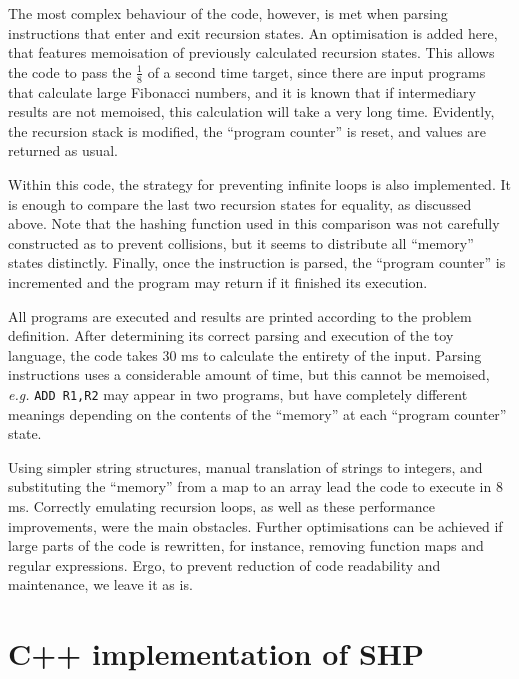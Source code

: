 \documentclass[12pt]{article}
\begin{document}
The most complex behaviour of the code, however, is met when parsing instructions that enter and exit recursion states. An optimisation is added here, that features memoisation of previously calculated recursion states. This allows the code to pass the $\frac{1}{8}$ of a second time target, since there are input programs that calculate large Fibonacci numbers, and it is known that if intermediary results are not memoised, this calculation will take a very long time. Evidently, the recursion stack is modified, the ``program counter'' is reset, and values are returned as usual.

Within this code, the strategy for preventing infinite loops is also implemented. It is enough to compare the last two recursion states for equality, as discussed above. Note that the hashing function used in this comparison was not carefully constructed as to prevent collisions, but it seems to distribute all ``memory'' states distinctly. Finally, once the instruction is parsed, the ``program counter'' is incremented and the program may return if it finished its execution.

All programs are executed and results are printed according to the problem definition. After determining its correct parsing and execution of the toy language, the code takes $30$ ms to calculate the entirety of the input. Parsing instructions uses a considerable amount of time, but this cannot be memoised, \emph{e.g.} \texttt{ADD R1,R2} may appear in two programs, but have completely different meanings depending on the contents of the ``memory'' at each ``program counter'' state.

Using simpler string structures, manual translation of strings to integers, and substituting the ``memory'' from a map to an array lead the code to execute in $8$ ms. Correctly emulating recursion loops, as well as these performance improvements, were the main obstacles. Further optimisations can be achieved if large parts of the code is rewritten, for instance, removing function maps and regular expressions. Ergo, to prevent reduction of code readability and maintenance, we leave it as is.




\appendix

\section{C++ implementation of SHP}\label{app:impl}

\end{document}

